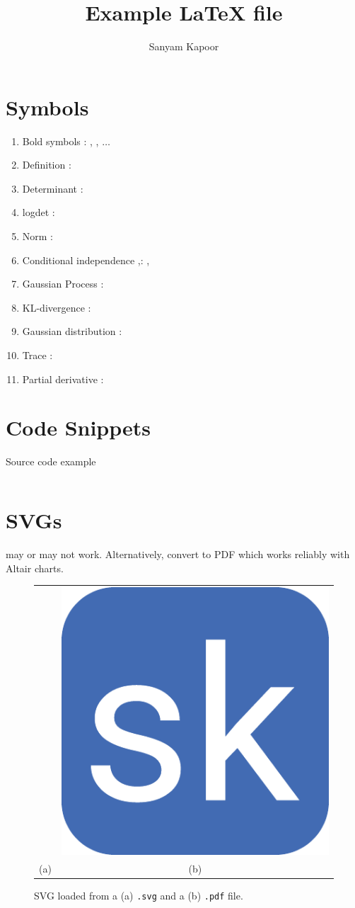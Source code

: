 \documentclass{article}
\title{Example \LaTeX{ }file}
\author{Sanyam Kapoor}
\begin{document}
\maketitle

\section{Symbols}

\begin{enumerate}%
\item Bold symbols \vrb{\mbf{}}: \mbf{\Sigma}, , $\dots$
\item Definition : 
\item Determinant \vrb{\determ{}}: \determ{\cdot}
\item logdet \vrb{\logdet{}}: \logdet{\cdot}
\item Norm \vrb{\norm{}}: \norm{\cdot}
\item Conditional independence \vrb{\ci},\vrb{\nci}: \ci, \nci
\item Gaussian Process \vrb{\gp}: \gp
\item KL-divergence \vrb{\kl}: \kl
\item Gaussian distribution \vrb{\gaussian{}}: \gaussian{\cdot, \cdot}
\item Trace \vrb{\tr{}}: \tr{\cdot}
\item Partial derivative \vrb{\pd{}{}}: 
\end{enumerate}

\section{Code Snippets}

\begin{code}
\caption{Source code example} \label{code:sample}
\inputminted[firstline=1,lastline=2,fontsize=\small]{python}{test.py}
\end{code}

\section{SVGs}

\vrb{} may or may not work. Alternatively, convert to PDF which
works reliably with Altair charts.

\begin{figure}[ht]
    \centering
    \begin{tabular}{cc}
         & \includegraphics[width=0.15\linewidth]{favicon.pdf} \\
        (a) & (b)
    \end{tabular}
    \caption{SVG loaded from a (a) \texttt{.svg} and a (b) \texttt{.pdf} file.}
    \label{fig:svg_pdf}
\end{figure}
\end{document}
